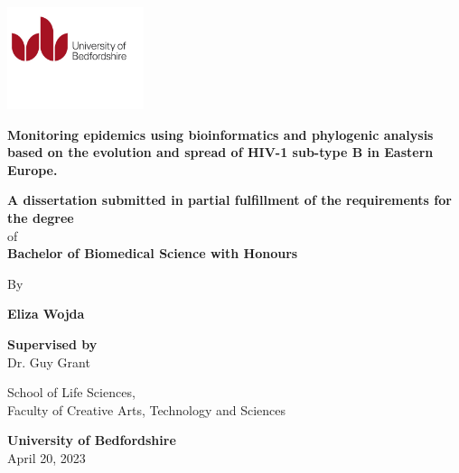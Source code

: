\begin{titlepage}

\ \begin{center}
        
        \hfill
        \includegraphics[width=0.3\textwidth]{images/ulogo.jpg}
        
        \vspace{0.5cm}
        
        \LARGE{\textbf{Monitoring epidemics using bioinformatics and phylogenic analysis based on the evolution and spread of HIV-1 sub-type B in Eastern Europe.}}

        \vspace{1.5cm}
        
        \large{\textbf{A dissertation submitted in partial fulfillment of the requirements for the degree}\\
        of \\
        \textbf{Bachelor of Biomedical Science with Honours}}
        
        \vspace{0.5cm}
        
        \large{By}
        
        \vspace{0.25cm}
        
        \Large{\textbf{Eliza Wojda}}

         \vspace{2cm}

        \large{\textbf{Supervised by}\\
        Dr. Guy Grant}
        
        \vspace{0.75cm}
        
        \large{School of Life Sciences,\\
        Faculty of Creative Arts, Technology and Sciences}\\

        \vspace{0.75cm}
        
        \large{\textbf{University of Bedfordshire}}\\
        \large{April 20, 2023}
        
    \end{center}
\end{titlepage}